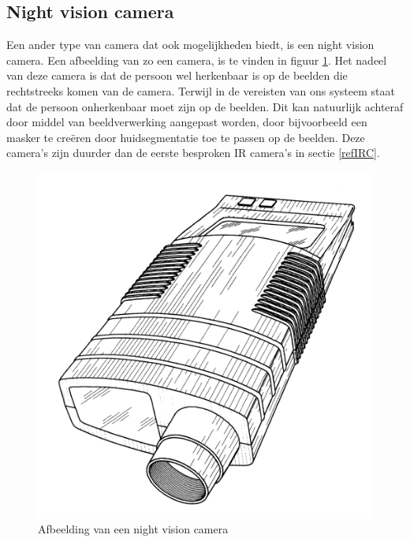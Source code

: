 \subsection{Night vision camera}
\label{refNVC}
Een ander type van camera dat ook mogelijkheden biedt, is een night vision camera. Een afbeelding van zo een camera, is te vinden in figuur \ref{imgNVC}\cite{bibNVC}. Het nadeel van deze camera is dat de persoon wel herkenbaar is op de beelden die rechtstreeks komen van de camera. Terwijl in de vereisten van ons systeem staat dat de persoon onherkenbaar moet zijn op de beelden. Dit kan natuurlijk achteraf door middel van beeldverwerking aangepast worden, door bijvoorbeeld een masker te cre\"eren door huidsegmentatie toe te passen op de beelden. Deze camera's zijn duurder dan de eerste besproken IR camera's in sectie \ref{refIRC}.
\begin{figure}[hbp]
	\includegraphics[scale=0.075]{NightVisionCamera}
	\caption{Afbeelding van een night vision camera}
	\label{imgNVC}
\end{figure}
